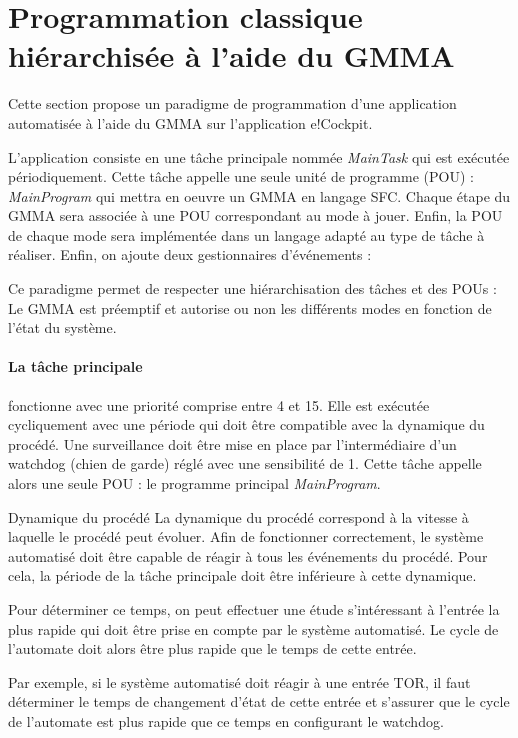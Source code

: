 \section{Programmation classique hiérarchisée à l'aide du GMMA}
Cette section propose un paradigme de programmation d'une application automatisée à l'aide du GMMA sur l'application e!Cockpit.

L'application consiste en une tâche principale nommée \emph{MainTask} qui est exécutée périodiquement. Cette tâche appelle une seule unité de programme (POU) : \emph{MainProgram} qui mettra en oeuvre un GMMA en langage SFC. Chaque étape du GMMA sera associée à une POU correspondant au mode à jouer. Enfin, la POU de chaque mode sera implémentée dans un langage adapté au type de tâche à réaliser. Enfin, on ajoute deux gestionnaires d'événements : \emph{}

Ce paradigme permet de respecter une hiérarchisation des tâches et des POUs : Le GMMA est préemptif et autorise ou non les différents modes en fonction de l'état du système.

\paragraph{La tâche principale} fonctionne avec une priorité comprise entre 4 et 15. Elle est exécutée cycliquement avec une période qui doit être compatible avec la dynamique du procédé. Une surveillance doit être mise en place par l'intermédiaire d'un watchdog (chien de garde) réglé avec une sensibilité de 1.
Cette tâche appelle alors une seule POU : le programme principal \emph{MainProgram}.

\begin{UPSTIinfor}{Dynamique du procédé}
    La dynamique du procédé correspond à la vitesse à laquelle le procédé peut évoluer. Afin de fonctionner correctement, le système automatisé doit être capable de réagir à tous les événements du procédé. Pour cela, la période de la tâche principale doit être inférieure à cette dynamique.

    Pour déterminer ce temps, on peut effectuer une étude s'intéressant à l'entrée la plus rapide qui doit être prise en compte par le système automatisé. Le cycle de l'automate doit alors être plus rapide que le temps de cette entrée.

    Par exemple, si le système automatisé doit réagir à une entrée TOR, il faut déterminer le temps de changement d'état de cette entrée et s'assurer que le cycle de l'automate est plus rapide que ce temps en configurant le watchdog.
\end{UPSTIinfor}

